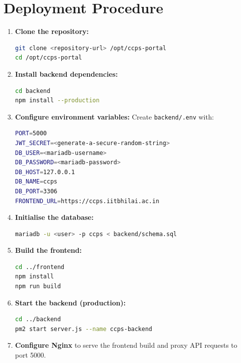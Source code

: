 \documentclass[12pt,a4paper]{article}
\begin{document}
\section{Deployment Procedure}

\begin{enumerate}
    \item \textbf{Clone the repository:}
    \begin{lstlisting}[style=sqlstyle, language=bash]
git clone <repository-url> /opt/ccps-portal
cd /opt/ccps-portal
    \end{lstlisting}
    
    \item \textbf{Install backend dependencies:}
    \begin{lstlisting}[style=sqlstyle, language=bash]
cd backend
npm install --production
    \end{lstlisting}
    
    \item \textbf{Configure environment variables:} Create \texttt{backend/.env} with:
    \begin{lstlisting}[style=sqlstyle, language=bash]
PORT=5000
JWT_SECRET=<generate-a-secure-random-string>
DB_USER=<mariadb-username>
DB_PASSWORD=<mariadb-password>
DB_HOST=127.0.0.1
DB_NAME=ccps
DB_PORT=3306
FRONTEND_URL=https://ccps.iitbhilai.ac.in
    \end{lstlisting}
    
    \item \textbf{Initialise the database:}
    \begin{lstlisting}[style=sqlstyle, language=bash]
mariadb -u <user> -p ccps < backend/schema.sql
    \end{lstlisting}
    
    \item \textbf{Build the frontend:}
    \begin{lstlisting}[style=sqlstyle, language=bash]
cd ../frontend
npm install
npm run build
    \end{lstlisting}
    
    \item \textbf{Start the backend (production):}
    \begin{lstlisting}[style=sqlstyle, language=bash]
cd ../backend
pm2 start server.js --name ccps-backend
    \end{lstlisting}
    
    \item \textbf{Configure Nginx} to serve the frontend build and proxy API requests to port 5000.
\end{enumerate}
\end{document}
